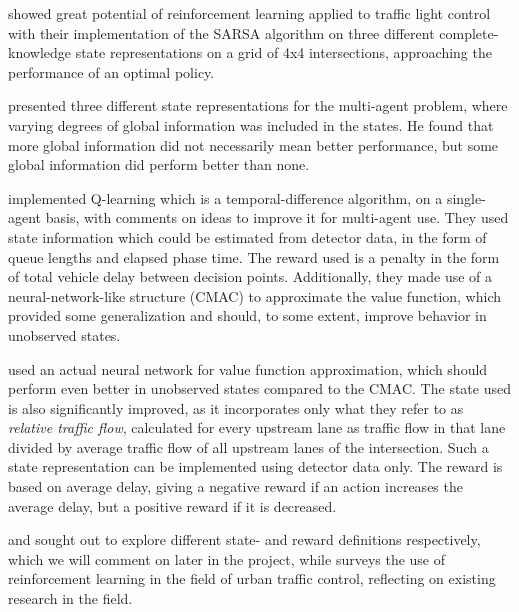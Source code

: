 \citet{Thorpe96trafficlight} showed great potential of reinforcement learning applied to traffic light control with their implementation of the SARSA algorithm on three different complete-knowledge state representations on a grid of 4x4 intersections, approaching the performance of an optimal policy.

\citet{wiering2000multi} presented three different state representations for the multi-agent problem, where varying degrees of global information was included in the states. 
He found that more global information did not necessarily mean better performance, but some global information did perform better than none.

\citet{AbdulhaiPringleKarakoulas} implemented Q-learning which is a temporal-difference algorithm, on a single-agent basis, with comments on ideas to improve it for multi-agent use. 
They used state information which could be estimated from detector data, in the form of queue lengths and elapsed phase time.  
The reward used is a penalty in the form of total vehicle delay between decision points. 
Additionally, they made use of a neural-network-like structure (CMAC) to approximate the value function, which provided some generalization and should, to some extent, improve behavior in unobserved states.

\citet{ItamarEtAl} used an actual neural network for value function approximation, which should perform even better in unobserved states compared to the CMAC. The state used is also significantly improved, as it incorporates only what they refer to as \emph{relative traffic flow}, calculated for every upstream lane as traffic flow in that lane divided by average traffic flow of all upstream lanes of the intersection. Such a state representation can be implemented using detector data only. The reward is based on average delay, giving a negative reward if an action increases the average delay, but a positive reward if it is decreased.

\citet{StateRepresentations} and \citet{ExploringRewardDefinitions} sought out to explore different state- and reward definitions respectively, which we will comment on later in the project, while \citet{ModelsAndAlgorithms} surveys the use of reinforcement learning in the field of urban traffic control, reflecting on existing research in the field.